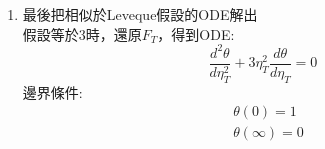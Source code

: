 \documentclass[../main.tex]{subfiles}
\begin{document}
\begin{itemize}
\begin{enumerate}
    代入上式:
    \begin{equation}
      4\xi \delta_T^2\delta_T' = \frac{4}{3}\xi (1.5 C x^{0.5}) = 2\xi C x^{0.5}
    \end{equation}
    以及:
    \begin{equation}
      \xi \frac{\delta_T^3}{x} = \xi \frac{C x^{1.5}}{x} = \xi C x^{0.5}
    \end{equation}
    可以看到他們的比例是2:1\\
    而兩個相減又要是3，所左邊會是6，右邊是3\\
    也就是說回到一開始的ODE:
    \begin{equation}
      \left[
        0.332\sqrt{
          \frac{\rho U^3}{\mu x}
        }\frac{\delta_T^2(x)}{\alpha} \frac{d\delta_T}{dx}
      \right] = 6, \quad
      \left[
        0.083 \sqrt{
          \frac{\rho U^3}{\mu x^3}
        } \frac{\delta_T^3(x)}{\alpha}
      \right] = 3
    \end{equation}
   而右邊那項，是可以把$\delta_T(x)$解出來的
   \begin{align}
    & 0.083 \sqrt{
          \frac{\rho U^3}{\mu x^3}
        } \frac{\delta_T^3(x)}{\alpha} 
       = 3 \nonumber\\
    \Rightarrow & \delta_T^3(x) = \frac{3}{0.083} \alpha\sqrt{
          \frac{\mu x^3}{\rho U^3}
        } \nonumber\\
    \Rightarrow & \delta_T(x) = \sqrt[3]{
      \frac{3}{0.083}
    }\cdot \alpha^{\frac{1}{3}} \left(
      \frac{\mu}{\rho U^3}
    \right)^{\frac{1}{6}} x^{\frac{1}{2}} \nonumber\\
    \Rightarrow & \delta_T(x) = 3.306 \cdot \alpha^{\frac{1}{3}} \left(
      \frac{\mu}{\rho U^3}
    \right)^{\frac{1}{6}} x^{\frac{1}{2}} \nonumber\\
    \Rightarrow & \boxed{\delta_T(x) = 3.306 \cdot \text{Pr}^{-\frac{1}{3}} \text{Re}_x^{-\frac{1}{2}} x} \label{eq:graetz_deltaT_exact_solution}
   \end{align}
   \item 最後把相似於Leveque假設的ODE解出\\
   假設等於3時，還原$F_T$，得到ODE:
  \begin{equation}
    \frac{d^2 \theta}{d\eta_T^2} + 3\eta_T^2 \frac{d\theta}{d\eta_T} = 0
  \end{equation}
  邊界條件:
  \begin{align}
    & \theta(0) = 1 \nonumber\\
    & \theta(\infty) = 0
  \end{align}

\end{enumerate}
\end{itemize}
\end{document}
